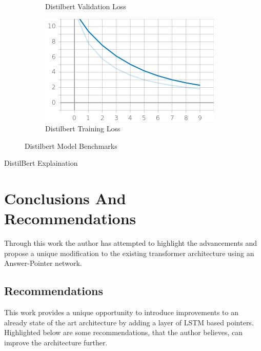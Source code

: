 \documentclass[a4paper,12pt]{report}
\begin{document}
\begin{figure}
\begin{subfigure}[b]{0.475\textwidth}
		\caption{\small Distilbert Validation Loss}    
		\label{DistilbertValLoss}
	\end{subfigure}
	\hfill
	\begin{subfigure}[b]{0.475\textwidth}
		\centering 
		\includegraphics[width=\textwidth]{../images/Distilbert_Train_Loss.png}
		\caption{\small Distilbert Training Loss}  
		\label{DistilbertTrainloss}
	\end{subfigure}
	\caption{Distilbert Model Benchmarks} 
	\label{distilbertBenchmarks}
\end{figure}

DistilBert Explaination


    \chapter{Conclusions And Recommendations}\label{c6}
    
    Through this work the author has attempted to highlight the advancements and propose a unique modification to the existing transformer architecture using an Answer-Pointer network. 
    
    \section{Recommendations}
    
    This work provides a unique opportunity to introduce improvements to an already state of the art architecture by adding a layer of LSTM based pointers. Highlighted below are some recommendations, that the author believes, can improve the architecture further.
    
\end{document}
